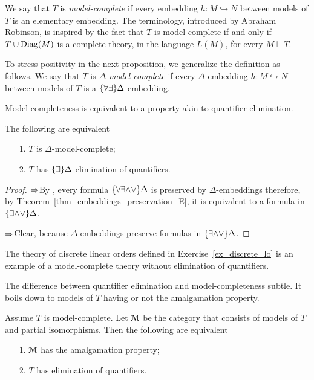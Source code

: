 We say that $T$ is \emph{model-complete\/} if every embedding $h:M\hookrightarrow N$ between models of $T$ is an elementary embedding. The terminology, introduced by Abraham Robinson, is inspired by the fact that $T$ is model-complete if and only if $T\cup{\rm Diag}(M)$ is a complete theory, in the language $L(M)$, for every $M\models T$. 

To stress positivity in the next proposition, we generalize the definition as follows. We say that $T$ is \emph{$\Delta$-model-complete\/} if every $\Delta$-embedding $h:M\hookrightarrow N$ between models of $T$ is a $\{\forall\exists\}\Delta$-embedding. 

Model-completeness is equivalent to a property akin to quantifier elimination.

\begin{proposition}
The following are equivalent
\begin{itemize}
\item[1.] $T$ is $\Delta$-model-complete;
\item[2.] $T$ has $\{\exists\}\Delta$-elimination of quantifiers.
\end{itemize}
\end{proposition}

\begin{proof}
$\Rightarrow$\quad By , every formula $\{\forall\exists\mathord\wedge\mathord\vee\}\Delta$ is preserved by $\Delta$-embeddings therefore, by Theorem~\ref{thm_embeddings_preservation_E}, it is equivalent to a formula in $\{\exists\mathord\wedge\mathord\vee\}\Delta$.

$\Rightarrow$\quad Clear, because $\Delta$-embeddings preserve formulas in $\{\exists\mathord\wedge\mathord\vee\}\Delta$.
\end{proof}

The theory of discrete linear orders defined in Exercise~\ref{ex_discrete_lo} is an example of a model-complete theory without elimination of quantifiers.


The difference between quantifier elimination and model-completeness subtle. It boils down to models of $T$ having or not the amalgamation property.

\begin{proposition}
Assume $T$ is model-complete. Let $\EuScript M$ be the category that consists of models of $T$ and partial isomorphisms. Then the following are equivalent
\begin{itemize}
\item[1.] $\EuScript M$ has the amalgamation property;
\item[2.] $T$ has elimination of quantifiers.
\end{itemize}
\end{proposition}

